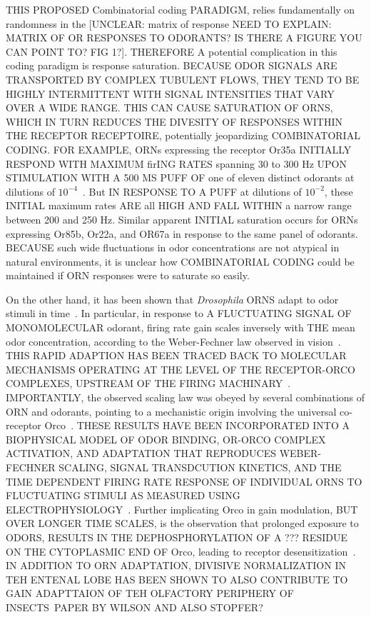 THIS PROPOSED Combinatorial coding PARADIGM, relies fundamentally on randomness in the [UNCLEAR: matrix of response NEED TO EXPLAIN: MATRIX OF OR RESPONSES TO ODORANTS? IS THERE A FIGURE YOU CAN POINT TO? FIG 1?]. THEREFORE A potential complication in this coding paradigm is response saturation. BECAUSE ODOR SIGNALS ARE TRANSPORTED BY COMPLEX TUBULENT FLOWS, THEY TEND TO BE HIGHLY INTERMITTENT WITH SIGNAL INTENSITIES THAT VARY OVER A WIDE RANGE\cite{celani}. THIS CAN CAUSE SATURATION OF ORNS, WHICH IN TURN REDUCES THE DIVESITY OF RESPONSES WITHIN THE RECEPTOR RECEPTOIRE, potentially jeopardizing COMBINATORIAL CODING. FOR EXAMPLE, ORNs expressing the receptor Or35a INITIALLY RESPOND WITH MAXIMUM firING RATES spanning 30 to 300 Hz UPON STIMULATION WITH A 500 MS PUFF OF one of eleven distinct odorants at dilutions of $10^{-4}$~\cite{hallem_carlson}. But IN RESPONSE TO A PUFF at dilutions of $10^{-2}$, these INITIAL maximum rates ARE all HIGH AND FALL WITHIN a narrow range between 200 and 250 Hz. Similar apparent INITIAL saturation occurs for ORNs expressing Or85b, Or22a, and OR67a in response to the same panel of odorants. BECAUSE such wide fluctuations in odor concentrations are not atypical in natural environments\cite{celani}, it is unclear how COMBINATORIAL CODING could be maintained if ORN responses were to saturate so easily. 

On the other hand, it has been shown that \textit{Drosophila} ORNS adapt to odor stimuli in time~\cite{NAGEL,martelli, srinivas_elife,cao_WL, cafaro_WL}. In particular, in response to A FLUCTUATING SIGNAL OF MONOMOLECULAR odorant, firing rate gain scales inversely with THE mean odor concentration, according to the Weber-Fechner law observed in vision~\cite{srinivas_elife}. THIS RAPID ADAPTION HAS BEEN TRACED BACK TO MOLECULAR MECHANISMS OPERATING AT THE LEVEL OF THE RECEPTOR-ORCO COMPLEXES, UPSTREAM OF THE FIRING MACHINARY~\cite{NAGEL,martelli, srinivas_elife,cao_WL, cafaro_WL}. IMPORTANTLY, the observed scaling law was obeyed by several combinations of ORN and odorants, pointing to a mechanistic origin involving the universal co-receptor Orco~\cite{Orco}. THESE RESULTS HAVE BEEN INCORPORATED INTO A BIOPHYSICAL MODEL OF ODOR BINDING, OR-ORCO COMPLEX ACTIVATION, AND ADAPTATION THAT REPRODUCES WEBER-FECHNER SCALING, SIGNAL TRANSDCUTION KINETICS, AND THE TIME DEPENDENT FIRING RATE RESPONSE OF INDIVIDUAL ORNS TO FLUCTUATING STIMULI AS MEASURED USING ELECTROPHYSIOLOGY~\cite{srinivas_elife}. Further implicating Orco in gain modulation, BUT OVER LONGER TIME SCALES, is the observation that prolonged exposure to ODORS, RESULTS IN THE DEPHOSPHORYLATION OF A ??? RESIDUE ON THE CYTOPLASMIC END OF Orco, leading to receptor desensitization~\cite{Guo_Smith_review, Guo_Smith}. IN ADDITION TO ORN ADAPTATION, DIVISIVE NORMALIZATION IN TEH ENTENAL LOBE HAS BEEN SHOWN TO ALSO CONTRIBUTE TO GAIN ADAPTTAION OF TEH OLFACTORY PERIPHERY OF INSECTS~\cite{}PAPER BY WILSON AND ALSO STOPFER?

